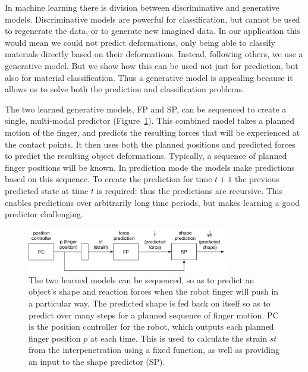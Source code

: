 \documentclass[journal]{IEEEtran}
\begin{document}
In machine learning there is division between discriminative and generative models. Discriminative models are powerful for classification, but cannot be used to regenerate the data, or to generate new imagined data. In our application this would mean we could not predict deformations, only being able to classify materials directly based on their deformations. Instead, following others, we use a generative model. But we show how this can be used not just for prediction, but also for material classification. Thus a generative model is appealing because it allows us to solve both the prediction and classification problems.

The two learned generative models, FP and SP, can be sequenced to create a single, multi-modal predictor (Figure~\ref{fig:prediction}). This combined model takes a planned motion of the finger, and predicts the resulting forces that will be experienced at the contact points. It then uses both the planned positions and predicted forces to predict the resulting object deformations. Typically, a sequence of planned finger positions will be known. In prediction mode the models make predictions based on this sequence. To create the prediction for time $t+1$ the previous predicted state at time $t$ is required: thus the predictions are recursive. This enables predictions over arbitrarily long time periods, but makes learning a good predictor challenging.

\begin{figure}[t]
\centering
\includegraphics[width=3.5in]{figures/prediction}%
\caption{The two learned models can be sequenced, so as to predict an object's shape and reaction forces when the robot finger will push in a particular way. The predicted shape is fed back on itself so as to predict over many steps for a planned sequence of finger motion. PC is the position controller for the robot, which outputs each planned finger position $p$ at each time. This is used to calculate the strain $st$ from the interpenetration using a fixed function, as well as providing an input to the shape predictor (SP).}
\label{fig:prediction}
\end{figure}
\end{document}
